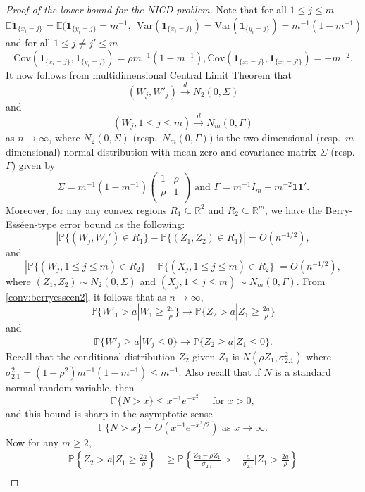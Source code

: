 \documentclass[11pt]{amsart}
\newcommand{\E}{\mathbb{E}}
\newcommand{\PP}{\mathbb{P}}
\newcommand{\1}{\mathbf{1}}
\def\E{{\mathbb E}}
\theoremstyle{definition}
\theoremstyle{plain}
\theoremstyle{remark}
\numberwithin{equation}{section}
\begin{document}
\begin{proof}[Proof of the lower bound for the NICD problem]
Note that for all $1 \le j \le m$
\[  \E\1_{\{x_i = j \}}  = \E (\1_{\{y_i = j \}}  =m^{-1}, \ \  \mathrm{Var}(\1_{\{x_i = j \}})  =   \mathrm{Var}(\1_{\{y_i = j \}}) = m^{-1}(1- m^{-1})\]
and for all $1 \le j \ne j' \le m$
\[ \mathrm{Cov} (\1_{\{x_i = j \}} , \1_{\{y_i = j \}}) =  \rho m^{-1}(1 -m^{-1}),   \mathrm{Cov} (\1_{\{x_i = j \}} , \1_{\{x_i = j' \}}) =  - m^{-2}. \]
 It now follows from multidimensional Central Limit Theorem that
\[  (W_j, W'_j) \stackrel{d}{\to} N_2(0, \Sigma)\]
and
\[ (W_j, 1\le j \le m) \stackrel{d}{\to} N_m(0, \Gamma) \]
as $n \to \infty$, where $N_2(0, \Sigma)$ (resp.\ $N_m(0, \Gamma)$)   is the two-dimensional  (resp.\ $m$-dimensional)  normal distribution with mean zero and covariance matrix $\Sigma$ (resp.\ $\Gamma$) given by
\[ \Sigma = m^{-1}(1  - m^{-1})  \begin{pmatrix}
 1 & \rho \\
\rho &1 \\
\end{pmatrix}
\text{ and }  \Gamma = m^{-1} I_m - m^{-2} \1\1'
.\]
Moreover, for any any convex regions $R_1 \subseteq \mathbb R^2$ and $R_2 \subseteq \mathbb R^m$, we have the Berry-Ess\'een-type error bound \cite{Sazonov81}  as the following:
\begin{equation} \label{conv:berryesseen2}
 \left| \PP\{ (W_j , W_j') \in R_1\} - \PP\{ (Z_1, Z_2) \in R_1\} \right | = O(n^{-1/2}),
 \end{equation}
and
\begin{equation} \label{conv:berryesseenm}
\left| \PP\{ (W_j , 1 \le j \le m) \in R_2\} - \PP\{ (X_j, 1 \le j \le m) \in R_2\} \right | = O(n^{-1/2}),
\end{equation}
where $ (Z_1, Z_2) \sim N_2(0, \Sigma)$ and $(X_j, 1 \le j \le m) \sim N_m(0, \Gamma)$.
From \eqref{conv:berryesseen2}, it follows that as $n \to \infty$,
\[   \PP\{ W'_1 >  a  | W_1 \ge   \tfrac{2 a}{\rho}  \}  \to \PP\{ Z_2 >  a  | Z_1  \ge  \tfrac{2a}{\rho} \} \]
and
\[  \PP\{ W'_j  \ge  a   | W_j \le 0 \} \to  \PP\{ Z_2  \ge  a  | Z_1 \le  0 \}.
\]
Recall that the conditional distribution  $Z_2 $ given  $Z_1$  is  $N(\rho Z_1, \sigma_{2.1}^2)$ where  $\sigma_{2.1}^2 = (1-\rho^2) m^{-1}(1 - m^{-1}) \le m^{-1}$. Also recall that  if $N$ is a standard normal random variable, then \[  \PP\{ N > x\} \le x^{-1} e^{-x^2} \quad \text{ for } x > 0,\]
and this bound is sharp in the asymptotic sense
\[ \PP\{ N > x\}  = \Theta(x^{-1} e^{-x^2/2}) \text{ as } x \to \infty. \]
Now for any $m \ge 2$,
\begin{align*}
\PP \left \{ Z_2 >   a \Big | Z_1  \ge  \tfrac{2 a}{\rho }  \right \}  &\ge  \PP \left  \{ \tfrac{Z_2  - \rho Z_1}{\sigma_{2.1}}  >  -\tfrac{a}{\sigma_{2.1} } \Big| Z_1  >  \tfrac{2a}{\rho}  \right \} \\

\end{align*}
\end{proof}
\end{document}
